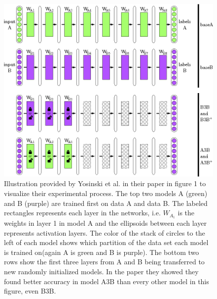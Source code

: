 \begin{figure}[h] 
    \centering
    \includegraphics[width=\linewidth]{Chapters/Background/figures/transfer_experiment.png}
    \caption{Illustration provided by Yosinski et al. in their paper\cite{yosinski2014transferable} in figure 1 to visualize their experimental process. The top two models A (green) and B (purple) are trained first on data A and data B. The labeled rectangles represents each layer in the networks, i.e. \(W_{A_{1}}\) is the weights in layer 1 in model A and the ellipsoids between each layer represents activation layers. The color of the stack of circles to the left of each model shows which partition of the data set each model is trained on(again A is green and B is purple). The bottom two rows show the first three layers from A and B being transferred to new randomly initialized models. In the paper they showed they found better accuracy in model A3B than every other model in this figure, even B3B.}
    \label{fig:transferexperiment}
\end{figure}

